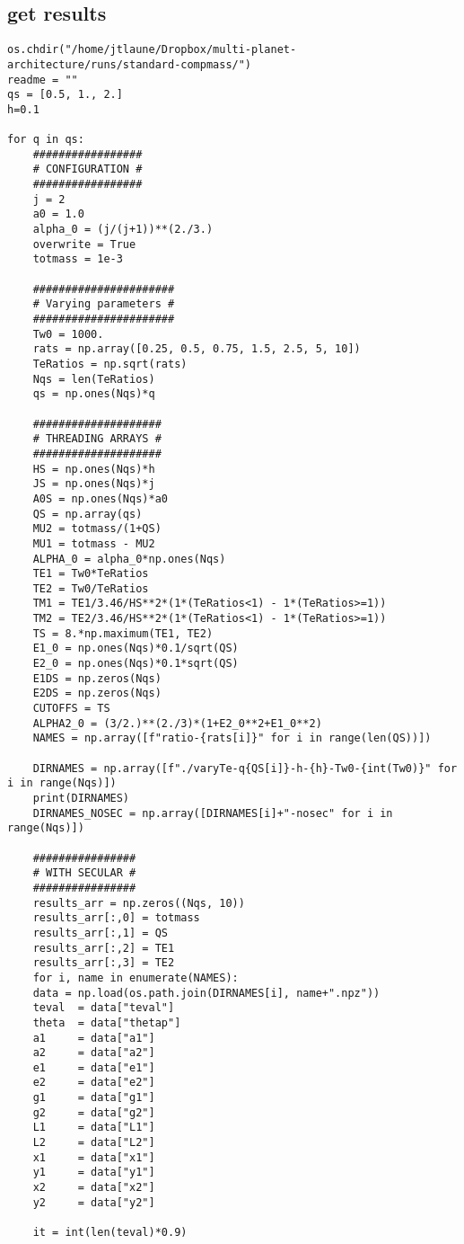 \documentclass[11pt]{article}
\begin{document}
\subsection{get results}
\label{sec:org7e345bc}
\begin{verbatim}
os.chdir("/home/jtlaune/Dropbox/multi-planet-architecture/runs/standard-compmass/")
readme = ""
qs = [0.5, 1., 2.]
h=0.1

for q in qs:
    #################
    # CONFIGURATION #
    #################
    j = 2
    a0 = 1.0
    alpha_0 = (j/(j+1))**(2./3.)
    overwrite = True
    totmass = 1e-3

    ######################
    # Varying parameters #
    ######################
    Tw0 = 1000.
    rats = np.array([0.25, 0.5, 0.75, 1.5, 2.5, 5, 10])
    TeRatios = np.sqrt(rats)
    Nqs = len(TeRatios)
    qs = np.ones(Nqs)*q

    ####################
    # THREADING ARRAYS #
    ####################
    HS = np.ones(Nqs)*h
    JS = np.ones(Nqs)*j
    A0S = np.ones(Nqs)*a0
    QS = np.array(qs)
    MU2 = totmass/(1+QS)
    MU1 = totmass - MU2
    ALPHA_0 = alpha_0*np.ones(Nqs)
    TE1 = Tw0*TeRatios
    TE2 = Tw0/TeRatios
    TM1 = TE1/3.46/HS**2*(1*(TeRatios<1) - 1*(TeRatios>=1))
    TM2 = TE2/3.46/HS**2*(1*(TeRatios<1) - 1*(TeRatios>=1))
    TS = 8.*np.maximum(TE1, TE2)
    E1_0 = np.ones(Nqs)*0.1/sqrt(QS)
    E2_0 = np.ones(Nqs)*0.1*sqrt(QS)
    E1DS = np.zeros(Nqs)
    E2DS = np.zeros(Nqs)
    CUTOFFS = TS
    ALPHA2_0 = (3/2.)**(2./3)*(1+E2_0**2+E1_0**2)
    NAMES = np.array([f"ratio-{rats[i]}" for i in range(len(QS))])

    DIRNAMES = np.array([f"./varyTe-q{QS[i]}-h-{h}-Tw0-{int(Tw0)}" for i in range(Nqs)])
    print(DIRNAMES)
    DIRNAMES_NOSEC = np.array([DIRNAMES[i]+"-nosec" for i in range(Nqs)])

    ################
    # WITH SECULAR #
    ################
    results_arr = np.zeros((Nqs, 10))
    results_arr[:,0] = totmass
    results_arr[:,1] = QS
    results_arr[:,2] = TE1
    results_arr[:,3] = TE2
    for i, name in enumerate(NAMES):
	data = np.load(os.path.join(DIRNAMES[i], name+".npz"))
	teval  = data["teval"]
	theta  = data["thetap"]
	a1     = data["a1"]
	a2     = data["a2"]
	e1     = data["e1"]
	e2     = data["e2"]
	g1     = data["g1"]
	g2     = data["g2"]
	L1     = data["L1"]
	L2     = data["L2"]
	x1     = data["x1"]
	y1     = data["y1"]
	x2     = data["x2"]
	y2     = data["y2"]

	it = int(len(teval)*0.9)


\end{verbatim}
\end{document}

